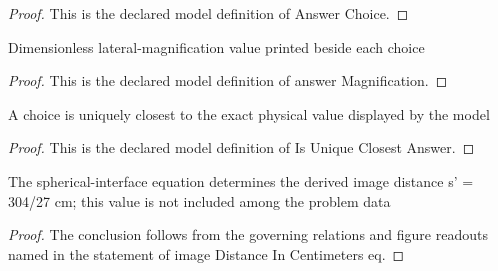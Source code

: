 \begin{proof}
  This is the declared model definition of Answer Choice.
\end{proof}
\begin{definition}
  \label{def:physics:phyx-mini-0040:phyxminiproblems-problemphyxmini0040-answermagnification}
  Dimensionless lateral-magnification value printed beside each choice
\end{definition}
\begin{proof}
  This is the declared model definition of answer Magnification.
\end{proof}
\begin{definition}
  \label{def:physics:phyx-mini-0040:phyxminiproblems-problemphyxmini0040-isuniqueclosestanswer}
  A choice is uniquely closest to the exact physical value displayed by the model
\end{definition}
\begin{proof}
  This is the declared model definition of Is Unique Closest Answer.
\end{proof}
\begin{lemma}
  \label{lem:physics:phyx-mini-0040:phyxminiproblems-problemphyxmini0040-imagedistanceincentimeters-eq}
  The spherical-interface equation determines the derived image distance s' = 304/27 cm; this value is not included among the problem data
\end{lemma}
\begin{proof}
  The conclusion follows from the governing relations and figure readouts named in the statement of image Distance In Centimeters eq.
\end{proof}
